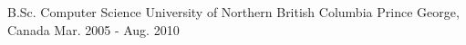 

\begin{cventries}

  \cventry
    {B.Sc. Computer Science} %
    {University of Northern British Columbia} %
    {Prince George, Canada} %
    {Mar. 2005 - Aug. 2010} %

\end{cventries}
